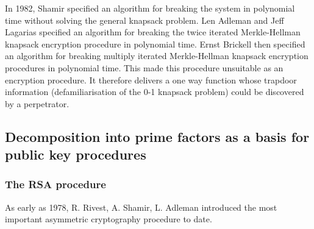 In 1982,  Shamir \cite{Shamir1982} specified an algorithm for 
breaking the system in polynomial time without solving the general knapsack 
problem. Len  Adleman \cite{Adleman1982} and Jeff 
Lagarias  \cite{Lagarias1983} specified an algorithm for 
breaking the twice iterated Merkle-Hellman knapsack encryption procedure in 
polynomial time. Ernst Brickell  \cite{Brickell1985} then 
specified an algorithm for breaking multiply iterated Merkle-Hellman knapsack 
encryption procedures in polynomial time. This made this procedure unsuitable as 
an encryption procedure. It therefore delivers a one way function whose trapdoor 
information (defamiliarisation of the 0-1 knapsack problem) could be discovered 
by a perpetrator.



\subsection{Decomposition into prime factors as a basis for public key 
procedures}





\subsubsection{The RSA procedure}
 \hypertarget{RSAVerfahren}{} As early as 1978, R.  Rivest,  A. Shamir,   L. Adleman \cite{RSA1978} introduced 
the most important asymmetric cryptography procedure to date.  \par


\begin{center}

\end{center}

